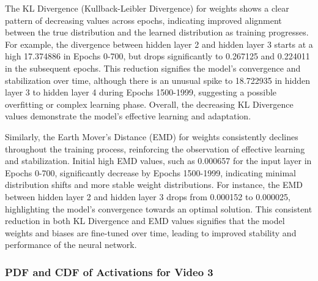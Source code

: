 \documentclass{ioereport}
\begin{document}
    The KL Divergence (Kullback-Leibler Divergence) for weights shows a clear pattern of decreasing values across epochs, indicating improved alignment between the true distribution and the learned distribution as training progresses. For example, the divergence between hidden layer 2 and hidden layer 3 starts at a high 17.374886 in Epochs 0-700, but drops significantly to 0.267125 and 0.224011 in the subsequent epochs. This reduction signifies the model's convergence and stabilization over time, although there is an unusual spike to 18.722935 in hidden layer 3 to hidden layer 4 during Epochs 1500-1999, suggesting a possible overfitting or complex learning phase. Overall, the decreasing KL Divergence values demonstrate the model's effective learning and adaptation.

    Similarly, the Earth Mover's Distance (EMD) for weights consistently declines throughout the training process, reinforcing the observation of effective learning and stabilization. Initial high EMD values, such as 0.000657 for the input layer in Epochs 0-700, significantly decrease by Epochs 1500-1999, indicating minimal distribution shifts and more stable weight distributions. For instance, the EMD between hidden layer 2 and hidden layer 3 drops from 0.000152 to 0.000025, highlighting the model's convergence towards an optimal solution. This consistent reduction in both KL Divergence and EMD values signifies that the model weights and biases are fine-tuned over time, leading to improved stability and performance of the neural network.


\subsubsection{PDF and CDF of Activations for Video 3}
\end{document}
